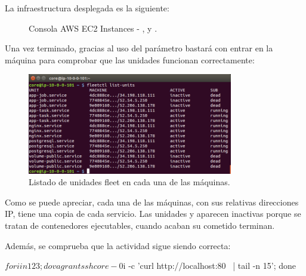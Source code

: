 La infraestructura desplegada es la siguiente:

\begin{figure}[H]
\caption{Consola AWS EC2 Instances - ,  y .}
\end{figure}

Una vez terminado, gracias al uso del parámetro  bastará con entrar en la máquina  para comprobar que las unidades funcionan correctamente:


\begin{figure}[H]
\centering
\includegraphics[width=0.8\textwidth]{images/figures/fleetctl-list-units.png}
\caption{Listado de unidades fleet en cada una de las máquinas.}
\end{figure}

Como se puede apreciar, cada una de las máquinas, con sus relativas direcciones IP, tiene una copia de cada servicio. Las unidades  y  aparecen inactivas porque se tratan de contenedores ejecutables, cuando acaban su cometido terminan.

Además, se comprueba que la actividad sigue siendo correcta:

\begin{code}
$ for i in 1 2 3; do vagrant ssh core-0$i -c 'curl http://localhost:80 \
  | tail -n 15'; done
\end{code}

